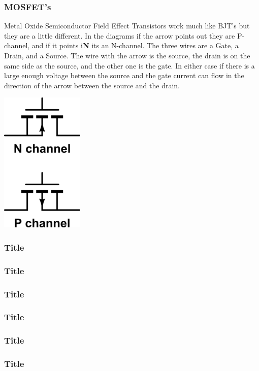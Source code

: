 \documentclass[10pt]{beamer}
\begin{document}
\begin{frame}
\frametitle{MOSFET's}
Metal Oxide Semiconductor Field Effect Transistors work much like BJT's but they are a little different. In the diagrams if the arrow points out they are P-channel, and if it points i\textbf{N} its an N-channel. The three wires are a Gate, a Drain, and a Source. The wire with the arrow is the source, the drain is on the same side as the source, and the other one is the gate. In either case if there is a large enough voltage between the source and the gate current can flow in the direction of the arrow between the source and the drain.
\begin{center}
\includegraphics{mosfets.png}
\end{center}
\end{frame}

\begin{frame}
\frametitle{Title}

\end{frame}

\begin{frame}
\frametitle{Title}

\end{frame}

\begin{frame}
\frametitle{Title}

\end{frame}

\begin{frame}
\frametitle{Title}

\end{frame}

\begin{frame}
\frametitle{Title}

\end{frame}

\begin{frame}
\frametitle{Title}

\end{frame}
\end{document}
